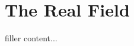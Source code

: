 \documentclass[../../templates/section]{subfiles}
\begin{document}
\section{The Real Field}\label{sec:the-real-field}

filler content...
\end{document}
